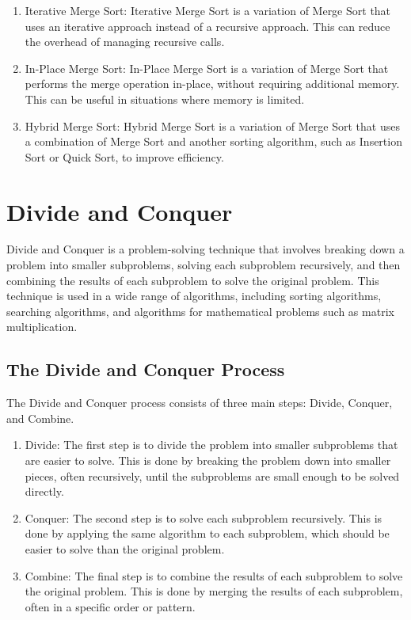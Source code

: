 \documentclass[a4paper, 11pt, oneside]{book} %
\begin{document}
\begin{enumerate}
  \item Iterative Merge Sort: Iterative Merge Sort is a variation of Merge Sort that uses an iterative approach instead of a recursive approach. This can reduce the overhead of managing recursive calls.
  \item In-Place Merge Sort: In-Place Merge Sort is a variation of Merge Sort that performs the merge operation in-place, without requiring additional memory. This can be useful in situations where memory is limited.
  \item Hybrid Merge Sort: Hybrid Merge Sort is a variation of Merge Sort that uses a combination of Merge Sort and another sorting algorithm, such as Insertion Sort or Quick Sort, to improve efficiency.
\end{enumerate}

\section{Divide and Conquer}

Divide and Conquer is a problem-solving technique that involves breaking down a problem into smaller subproblems, solving each subproblem recursively, and then combining the results of each subproblem to solve the original problem. This technique is used in a wide range of algorithms, including sorting algorithms, searching algorithms, and algorithms for mathematical problems such as matrix multiplication.

\subsection{The Divide and Conquer Process}
The Divide and Conquer process consists of three main steps: Divide, Conquer, and Combine.
\begin{enumerate}
  \item Divide: The first step is to divide the problem into smaller subproblems that are easier to solve. This is done by breaking the problem down into smaller pieces, often recursively, until the subproblems are small enough to be solved directly.
  \item Conquer: The second step is to solve each subproblem recursively. This is done by applying the same algorithm to each subproblem, which should be easier to solve than the original problem.
  \item Combine: The final step is to combine the results of each subproblem to solve the original problem. This is done by merging the results of each subproblem, often in a specific order or pattern.
\end{enumerate}
\end{document}
